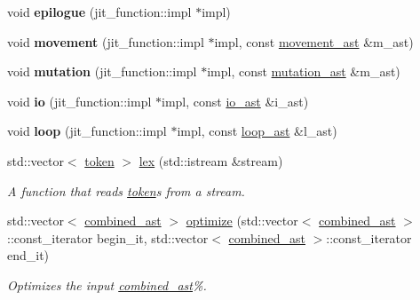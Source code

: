 \begin{DoxyCompactItemize}
void {\bfseries epilogue} (jit\+\_\+function\+::impl $\ast$impl)
\item 
\hypertarget{namespacebfjit_a2074dd9fc2ff8ea0960e66bdb2bb9a5a}{}\label{namespacebfjit_a2074dd9fc2ff8ea0960e66bdb2bb9a5a} 
void {\bfseries movement} (jit\+\_\+function\+::impl $\ast$impl, const \hyperlink{classbfjit_1_1movement__ast}{movement\+\_\+ast} \&m\+\_\+ast)
\item 
\hypertarget{namespacebfjit_a73bb08eeefd210b9252ae57d5e920956}{}\label{namespacebfjit_a73bb08eeefd210b9252ae57d5e920956} 
void {\bfseries mutation} (jit\+\_\+function\+::impl $\ast$impl, const \hyperlink{classbfjit_1_1mutation__ast}{mutation\+\_\+ast} \&m\+\_\+ast)
\item 
\hypertarget{namespacebfjit_af8ac98f27907450e44251e60653b8226}{}\label{namespacebfjit_af8ac98f27907450e44251e60653b8226} 
void {\bfseries io} (jit\+\_\+function\+::impl $\ast$impl, const \hyperlink{classbfjit_1_1io__ast}{io\+\_\+ast} \&i\+\_\+ast)
\item 
\hypertarget{namespacebfjit_a0cca116c9c12075bcd8866d50251327d}{}\label{namespacebfjit_a0cca116c9c12075bcd8866d50251327d} 
void {\bfseries loop} (jit\+\_\+function\+::impl $\ast$impl, const \hyperlink{classbfjit_1_1loop__ast}{loop\+\_\+ast} \&l\+\_\+ast)
\item 
std\+::vector$<$ \hyperlink{classbfjit_1_1token}{token} $>$ \hyperlink{namespacebfjit_afc8d63bb8e810f0a8386783924340045}{lex} (std\+::istream \&stream)
\begin{DoxyCompactList}\small\item\em A function that reads \hyperlink{classbfjit_1_1token}{token}s from a stream. \end{DoxyCompactList}\item 
std\+::vector$<$ \hyperlink{namespacebfjit_ad9bbdb76861e57928b1bc7695c2c0623}{combined\+\_\+ast} $>$ \hyperlink{namespacebfjit_a6d6a3107cfe22399215c398dd5d25d85}{optimize} (std\+::vector$<$ \hyperlink{namespacebfjit_ad9bbdb76861e57928b1bc7695c2c0623}{combined\+\_\+ast} $>$\+::const\+\_\+iterator begin\+\_\+it, std\+::vector$<$ \hyperlink{namespacebfjit_ad9bbdb76861e57928b1bc7695c2c0623}{combined\+\_\+ast} $>$\+::const\+\_\+iterator end\+\_\+it)
\begin{DoxyCompactList}\small\item\em Optimizes the input \hyperlink{namespacebfjit_ad9bbdb76861e57928b1bc7695c2c0623}{combined\+\_\+ast}\%. \end{DoxyCompactList}\item 
\hypertarget{namespacebfjit_ae336474650e07d599dae9e197f7565a2}{}\label{namespacebfjit_ae336474650e07d599dae9e197f7565a2} 

\end{DoxyCompactItemize}
